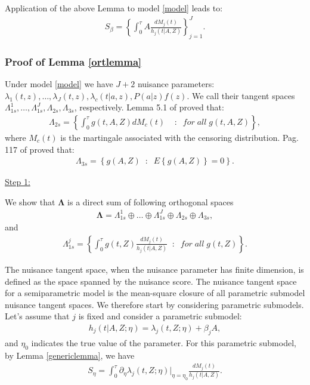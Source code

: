 \documentclass[11pt]{article}
\newcommand{\ee}{\end{eqnarray}}
\newcommand{\eqnn}{\begin{eqnarray*}}
\newcommand{\een}{\end{eqnarray*}}
\newcommand{\be}{\begin{eqnarray}}
\begin{document}
Application of the above Lemma to model \eqref{model} leads to:
\be\label{eq:S_beta}
S_\beta=\left\{\int_0^\tau A \frac{dM_j(t)}{h_j(t | A,Z)}\right\}_{j=1}^J.
\ee



\subsubsection{Proof of Lemma \ref{ortlemma}} %

Under model \eqref{model} we have $J+2$ nuisance parameters: 
 $\lambda_1(t, z),\ldots,\lambda_J(t, z),\lambda_{c}(t | a,z),P(a| z)f(z)$. We call their tangent spaces $\Lambda_{1s}^1,\ldots,\Lambda_{1s}^J,\Lambda_{2s},\Lambda_{3s}$, respectively.
Lemma 5.1 of \citet{tsiatis2007semiparametric} proved that:
\be
\Lambda_{2s}=\left\{\int_0^\tau g(t,A,Z) dM_c(t)\;\;\;\;:\;\;for\;all\;g(t,A,Z)\right\},
\ee
where $M_c(t)$ is the martingale associated with the censoring distribution. 
Pag. 117 of \citet{tsiatis2007semiparametric} proved that:
\be
\Lambda_{3s}=\left\{g(A,Z) \;\;:\;\;E\left\{g(A,Z)\right\}=0\right\}.
\ee

\underline{Step 1:}

We show that $\mathbf\Lambda$ is a direct sum of following orthogonal spaces
\be\label{decspecn}%
\mathbf\Lambda=\Lambda_{1s}^1\oplus\ldots\oplus\Lambda_{1s}^J\oplus \Lambda_{2s} \oplus \Lambda_{3s},
\ee
and
\be\label{con}
\Lambda_{1s}^j=\left\{\int_0^\tau g(t,Z) \frac{dM_j(t)}{h_j(t | A,Z)}\;\;:\;\;for\;all\;g(t,Z)\right\}.
\ee



The nuisance tangent space, when the nuisance parameter has finite dimension, is defined as the space spanned by the nuisance score.
The nuisance tangent space for a semiparametric model is the mean-square closure of all parametric submodel nuisance tangent spaces.
We therefore start by considering parametric submodels.
Let's assume that $j$ is fixed and
 consider a parametric submodel:
\eqnn
h_j(t | A,Z ; \eta)=\lambda_j(t,Z; \eta) + \beta_jA,
\een
and $\eta_0$ indicates the true value of the parameter.
For this parametric submodel, by Lemma \ref{genericlemma}, we have 
\eqnn
S_{\eta}=\int_0^\tau \partial_{\eta}\lambda_j(t,Z ; \eta)|_{\eta=\eta_{0}} \frac{dM_{j}(t)}{h_j(t | A,Z)}.\een
\end{document}
